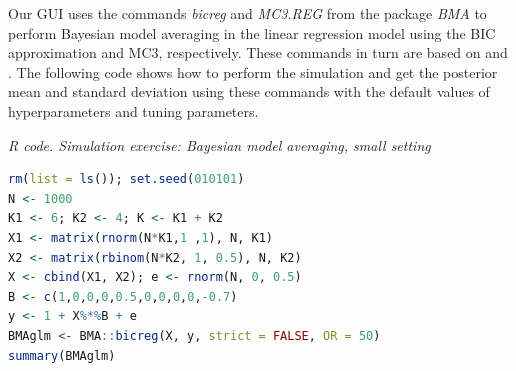 Our GUI uses the commands \textit{bicreg} and \textit{MC3.REG} from the package \textit{BMA} to perform Bayesian model averaging in the linear regression model using the BIC approximation and MC3, respectively. These commands in turn are based on \cite{Raftery1995} and \cite{Raftery1997}. The following code shows how to perform the simulation and get the posterior mean and standard deviation using these commands with the default values of hyperparameters and tuning parameters.

\begin{tcolorbox}[enhanced,width=4.67in,center upper,
	fontupper=\large\bfseries,drop shadow southwest,sharp corners]
	\textit{R code. Simulation exercise: Bayesian model averaging, small setting}
	\begin{VF}
		\begin{lstlisting}[language=R]
rm(list = ls()); set.seed(010101)
N <- 1000
K1 <- 6; K2 <- 4; K <- K1 + K2
X1 <- matrix(rnorm(N*K1,1 ,1), N, K1)
X2 <- matrix(rbinom(N*K2, 1, 0.5), N, K2)
X <- cbind(X1, X2); e <- rnorm(N, 0, 0.5)
B <- c(1,0,0,0,0.5,0,0,0,0,-0.7)
y <- 1 + X%*%B + e
BMAglm <- BMA::bicreg(X, y, strict = FALSE, OR = 50) 
summary(BMAglm)
\end{lstlisting}
	\end{VF}
\end{tcolorbox} 

